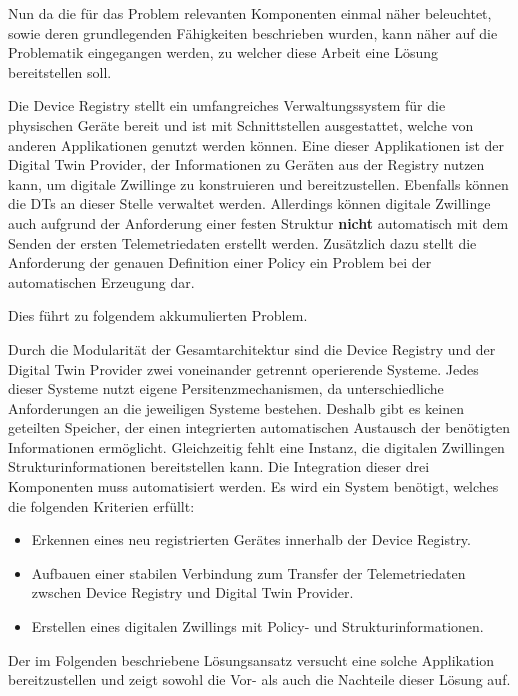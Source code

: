 Nun da die für das Problem relevanten Komponenten einmal näher beleuchtet, sowie deren grundlegenden Fähigkeiten beschrieben wurden, kann näher auf die Problematik eingegangen werden, zu welcher diese Arbeit eine Lösung bereitstellen soll. 

Die Device Registry stellt ein umfangreiches Verwaltungssystem für die physischen Geräte bereit und ist mit Schnittstellen ausgestattet, welche von anderen Applikationen genutzt werden können. Eine dieser Applikationen ist der Digital Twin Provider, der Informationen zu Geräten aus der Registry nutzen kann, um digitale Zwillinge zu konstruieren und bereitzustellen. Ebenfalls können die \ac{DT}s an dieser Stelle verwaltet werden. Allerdings können digitale Zwillinge auch aufgrund der Anforderung einer festen Struktur \textbf{nicht} automatisch mit dem Senden der ersten Telemetriedaten erstellt werden. Zusätzlich dazu stellt die Anforderung der genauen Definition einer Policy ein Problem bei der automatischen Erzeugung dar.

Dies führt zu folgendem akkumulierten Problem.

\begin{problem}
    Durch die Modularität der Gesamtarchitektur sind die Device Registry und der Digital Twin Provider zwei voneinander getrennt operierende Systeme. Jedes dieser Systeme nutzt eigene Persitenzmechanismen, da unterschiedliche Anforderungen an die jeweiligen Systeme bestehen. Deshalb gibt es keinen geteilten Speicher, der einen integrierten automatischen Austausch der benötigten Informationen ermöglicht. Gleichzeitig fehlt eine Instanz, die digitalen Zwillingen Strukturinformationen bereitstellen kann. Die Integration dieser drei Komponenten muss automatisiert werden. Es wird ein System benötigt, welches die folgenden Kriterien erfüllt:

    \begin{itemize}
        \item Erkennen eines neu registrierten Gerätes innerhalb der Device Registry.
        \item Aufbauen einer stabilen Verbindung zum Transfer der Telemetriedaten zwschen Device Registry und Digital Twin Provider.
        \item Erstellen eines digitalen Zwillings mit Policy- und Strukturinformationen.
    \end{itemize}
\end{problem}

Der im Folgenden beschriebene Lösungsansatz versucht eine solche Applikation bereitzustellen und zeigt sowohl die Vor- als auch die Nachteile dieser Lösung auf.

